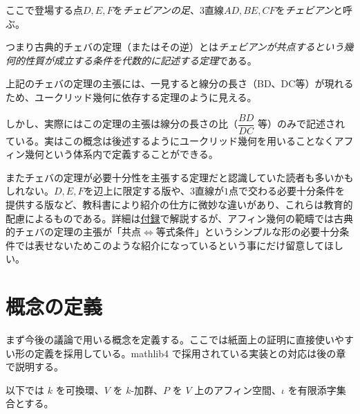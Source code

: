 \documentclass[a4paper,12pt]{bxjsbook}
\newlength{\customindent}
\newenvironment{body}{
  \par
  \begingroup
  \setlength{\leftskip}{\customindent}
  \setlength{\rightskip}{0pt}
  \setlength{\parindent}{1em}
  \setlength{\displayindent}{\customindent}
  \setlength{\displaywidth}{\dimexpr\linewidth-\customindent\relax}
}{
  \par
  \endgroup
}
\theoremstyle{theorem}
\begin{document}
    \begin{body}
        \indent ここで登場する点$D,E,F$を\emph{チェビアンの足}、$3$直線$AD,BE,CF$を\emph{チェビアン}と呼ぶ。

        \indent つまり古典的チェバの定理（またはその逆）とは\emph{チェビアンが共点するという幾何的性質が成立する条件を代数的に記述する定理}である。

        \indent 上記のチェバの定理の主張には、一見すると線分の長さ（BD、DC等）が現れるため、ユークリッド幾何に依存する定理のように見える。

        \indent しかし、実際にはこの定理の主張は線分の長さの比（$\dfrac{BD}{DC}$ 等）のみで記述されている。実はこの概念は後述するようにユークリッド幾何を用いることなくアフィン幾何という体系内で定義することができる。

        \indent またチェバの定理が必要十分性を主張する定理だと認識していた読者も多いかもしれない。$D,E,F$を辺上に限定する版や、$3$直線が$1$点で交わる必要十分条件を提供する版など、教科書により紹介の仕方に微妙な違いがあり、これらは教育的配慮によるものである。詳細は\hyperref[appendix:classical-ceva-version]{付録}で解説するが、アフィン幾何の範疇では古典的チェバの定理の主張が「共点$⇔$等式条件」というシンプルな形の必要十分条件では表せないためこのような紹介になっているという事にだけ留意してほしい。
    \end{body}


    \section{概念の定義}
    \begin{body}
        \indent まず今後の議論で用いる概念を定義する。ここでは紙面上の証明に直接使いやすい形の定義を採用している。mathlib4 で採用されている実装との対応は後の章で説明する。

        \indent 以下では $k$ を可換環、$V$ を $k$-加群、$P$ を $V$ 上のアフィン空間、$\iota$ を有限添字集合とする。
    \end{body}
\end{document}
